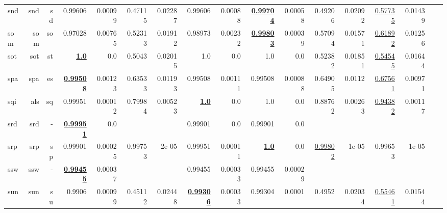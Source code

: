 \documentclass[11pt]{article}
\begin{document}
\begin{table*}[h]
{\begin{tabular}{lrrrrrrrrrrrrrrrr}
snd         & snd         & sd         & 0.99606         & 0.00099         & 0.47115         & 0.02287         & 0.99606         & 0.00088         & \textbf{\underline{0.99704}}         & 0.00058         & 0.49206         & 0.02092         & \underline{0.57735}         & 0.01439         \\
som         & som         & so         & 0.97028         & 0.00765         & 0.52313         & 0.01912         & 0.98973         & 0.00232         & \textbf{\underline{0.99803}}         & 0.00039         & 0.57094         & 0.01571         & \underline{0.61892}         & 0.01256         \\
sot         & sot         & st         & \textbf{\underline{1.0}}         & 0.0         & 0.5043         & 0.02015         & 1.0         & 0.0         & 1.0         & 0.0         & 0.52382         & 0.01851         & \underline{0.54545}         & 0.01644         \\
spa         & spa         & es         & \textbf{\underline{0.99508}}         & 0.00123         & 0.63533         & 0.01193         & 0.99508         & 0.00111         & 0.99508         & 0.00088         & 0.64905         & 0.0112         & \underline{0.67561}         & 0.00971         \\
sqi         & als         & sq         & 0.99951         & 0.00012         & 0.79984         & 0.00523         & \textbf{\underline{1.0}}         & 0.0         & 1.0         & 0.0         & 0.88762         & 0.00263         & \underline{0.94382}         & 0.00117         \\
srd         & srd         & -         & \textbf{\underline{0.99951}}         & 0.0         &          &          & 0.99901         & 0.0         & 0.99901         & 0.0         &          &          &          &          \\
srp         & srp         & sp         & 0.99901         & 0.00025         & 0.99753         & 2e-05         & 0.99951         & 0.00011         & \textbf{\underline{1.0}}         & 0.0         & \underline{0.99802}         & 1e-05         & 0.99653         & 1e-05         \\
ssw         & ssw         & -         & \textbf{\underline{0.99455}}         & 0.00037         &          &          & 0.99455         & 0.00033         & 0.99455         & 0.00029         &          &          &          &          \\
sun         & sun         & su         & 0.9906         & 0.00099         & 0.45112         & 0.02448         & \textbf{\underline{0.99306}}         & 0.00033         & 0.99304         & 0.0001         & 0.4952         & 0.02034         & \underline{0.55461}         & 0.01544         \\

\end{tabular}}
\end{table*}
\end{document}
